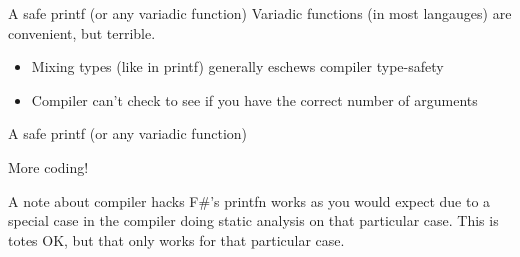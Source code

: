 \documentclass{beamer}
\begin{document}
\begin{frame}{A safe printf (or any variadic function)}
	\transdissolve
	Variadic functions (in most langauges) are convenient, but terrible.
	\begin{itemize}
	  \pause
          \item Mixing types (like in printf) generally eschews compiler type-safety
	  \pause
	  \item Compiler can't check to see if you have the correct number of arguments
	\end{itemize}
\end{frame}
\begin{frame}{A safe printf (or any variadic function)}
	\transdissolve
	\begin{center} 
	  More coding!
	\end{center}
\end{frame}
\begin{frame}{A note about compiler hacks}
 		\transdissolve
  F\#'s printfn works as you would expect due to a special case in the compiler doing static analysis on that particular case. 
  \linebreak
  \linebreak
  \pause
  This is totes OK, but that only works for that particular case.
\end{frame}
\end{document}
